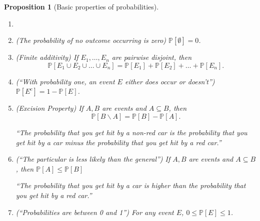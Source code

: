 \documentclass[10pt]{article}
\newtheorem{proposition}[theorem]{Proposition}
\theoremstyle{definition}
\newcommand{\1}[1]{\textbf{1}_{\left[#1\right]}} %
\def\P{\mathbb{P}} %
\begin{document}
\begin{proposition}[Basic properties of probabilities]
  \label{prop:some-deductions-from-axioms}
  \begin{enumerate}[label=\rm{(\roman*.)}]
    \item []
    \item (The probability of no outcome occurring is zero) \label{item:empty-set-has-prob-zero}
    $\P\left[\emptyset \right] = 0$.

    \item (Finite additivity) \label{item:finite-additivity} If
    $E_{1},\ldots,E_{n}$ are pairwise disjoint, then
    \begin{equation*}
      \P\left[E_{1}\cup E_{2}\cup\ldots\cup E_{n} \right] 
      = \P\left[E_{1} \right]+\P\left[E_{2} \right]+\ldots+\P\left[E_{n} \right].
    \end{equation*}
    \item (``With probability one, an event $E$ either does occur or
    doesn't'') \label{item:complements}
    $\P\left[E^{c} \right] = 1-\P\left[E \right]$.

    
    \item (Excision Property) \label{item:excision-property} If $A,B$ are
    events and $A\subseteq B$, then
    \begin{equation*}
      \P\left[B\backslash A \right] = \P\left[B \right] - \P\left[A \right].
    \end{equation*}

    ``The probability that you get hit by a non-red car is the probability that
    you get hit by a car minus the probability that you get hit by a red car.''
    
    \item (``The particular is less likely than the general'') \label{item:subsets} If $A,B$ are events and $A\subseteq B$, then
    $\P\left[ A\right] \leq \P\left[B \right]$

    ``The probability that you get hit by a car is higher than the probability
    that you get hit by a red car.''
    
    \item (``Probabilities are between 0 and
    1'') \label{item:probabilities-are-in-unit-interval} For any event $E$,
    $0 \leq \P\left[E \right] \leq 1$.
  \end{enumerate}
\end{proposition}
\end{document}
